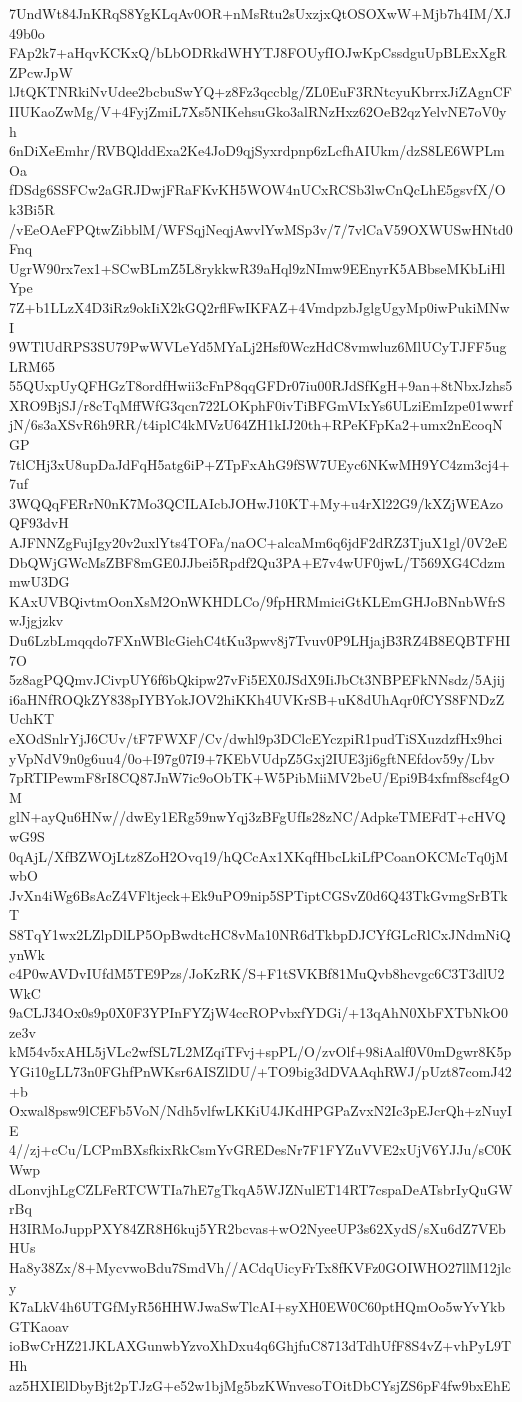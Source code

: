 7UndWt84JnKRqS8YgKLqAv0OR+nMsRtu2sUxzjxQtOSOXwW+Mjb7h4IM/XJ49b0o
FAp2k7+aHqvKCKxQ/bLbODRkdWHYTJ8FOUyfIOJwKpCssdguUpBLExXgRZPcwJpW
lJtQKTNRkiNvUdee2bcbuSwYQ+z8Fz3qccblg/ZL0EuF3RNtcyuKbrrxJiZAgnCF
IIUKaoZwMg/V+4FyjZmiL7Xs5NIKehsuGko3alRNzHxz62OeB2qzYelvNE7oV0yh
6nDiXeEmhr/RVBQlddExa2Ke4JoD9qjSyxrdpnp6zLcfhAIUkm/dzS8LE6WPLmOa
fDSdg6SSFCw2aGRJDwjFRaFKvKH5WOW4nUCxRCSb3lwCnQcLhE5gsvfX/Ok3Bi5R
/vEeOAeFPQtwZibblM/WFSqjNeqjAwvlYwMSp3v/7/7vlCaV59OXWUSwHNtd0Fnq
UgrW90rx7ex1+SCwBLmZ5L8rykkwR39aHql9zNImw9EEnyrK5ABbseMKbLiHlYpe
7Z+b1LLzX4D3iRz9okIiX2kGQ2rflFwIKFAZ+4VmdpzbJglgUgyMp0iwPukiMNwI
9WTlUdRPS3SU79PwWVLeYd5MYaLj2Hsf0WczHdC8vmwluz6MlUCyTJFF5ugLRM65
55QUxpUyQFHGzT8ordfHwii3cFnP8qqGFDr07iu00RJdSfKgH+9an+8tNbxJzhs5
XRO9BjSJ/r8cTqMffWfG3qcn722LOKphF0ivTiBFGmVIxYs6ULziEmIzpe01wwrf
jN/6s3aXSvR6h9RR/t4iplC4kMVzU64ZH1kIJ20th+RPeKFpKa2+umx2nEcoqNGP
7tlCHj3xU8upDaJdFqH5atg6iP+ZTpFxAhG9fSW7UEyc6NKwMH9YC4zm3cj4+7uf
3WQQqFERrN0nK7Mo3QCILAIcbJOHwJ10KT+My+u4rXl22G9/kXZjWEAzoQF93dvH
AJFNNZgFujIgy20v2uxlYts4TOFa/naOC+alcaMm6q6jdF2dRZ3TjuX1gl/0V2eE
DbQWjGWcMsZBF8mGE0JJbei5Rpdf2Qu3PA+E7v4wUF0jwL/T569XG4CdzmmwU3DG
KAxUVBQivtmOonXsM2OnWKHDLCo/9fpHRMmiciGtKLEmGHJoBNnbWfrSwJjgjzkv
Du6LzbLmqqdo7FXnWBlcGiehC4tKu3pwv8j7Tvuv0P9LHjajB3RZ4B8EQBTFHI7O
5z8agPQQmvJCivpUY6f6bQkipw27vFi5EX0JSdX9IiJbCt3NBPEFkNNsdz/5Ajij
i6aHNfROQkZY838pIYBYokJOV2hiKKh4UVKrSB+uK8dUhAqr0fCYS8FNDzZUchKT
eXOdSnlrYjJ6CUv/tF7FWXF/Cv/dwhl9p3DClcEYczpiR1pudTiSXuzdzfHx9hci
yVpNdV9n0g6uu4/0o+I97g07I9+7KEbVUdpZ5Gxj2IUE3ji6gftNEfdov59y/Lbv
7pRTIPewmF8rI8CQ87JnW7ic9oObTK+W5PibMiiMV2beU/Epi9B4xfmf8scf4gOM
glN+ayQu6HNw//dwEy1ERg59nwYqj3zBFgUfIs28zNC/AdpkeTMEFdT+cHVQwG9S
0qAjL/XfBZWOjLtz8ZoH2Ovq19/hQCcAx1XKqfHbcLkiLfPCoanOKCMcTq0jMwbO
JvXn4iWg6BsAcZ4VFltjeck+Ek9uPO9nip5SPTiptCGSvZ0d6Q43TkGvmgSrBTkT
S8TqY1wx2LZlpDlLP5OpBwdtcHC8vMa10NR6dTkbpDJCYfGLcRlCxJNdmNiQynWk
c4P0wAVDvIUfdM5TE9Pzs/JoKzRK/S+F1tSVKBf81MuQvb8hcvgc6C3T3dlU2WkC
9aCLJ34Ox0s9p0X0F3YPInFYZjW4ccROPvbxfYDGi/+13qAhN0XbFXTbNkO0ze3v
kM54v5xAHL5jVLc2wfSL7L2MZqiTFvj+spPL/O/zvOlf+98iAalf0V0mDgwr8K5p
YGi10gLL73n0FGhfPnWKsr6AISZlDU/+TO9big3dDVAAqhRWJ/pUzt87comJ42+b
Oxwal8psw9lCEFb5VoN/Ndh5vlfwLKKiU4JKdHPGPaZvxN2Ic3pEJcrQh+zNuyIE
4//zj+cCu/LCPmBXsfkixRkCsmYvGREDesNr7F1FYZuVVE2xUjV6YJJu/sC0KWwp
dLonvjhLgCZLFeRTCWTIa7hE7gTkqA5WJZNulET14RT7cspaDeATsbrIyQuGWrBq
H3IRMoJuppPXY84ZR8H6kuj5YR2bcvas+wO2NyeeUP3s62XydS/sXu6dZ7VEbHUs
Ha8y38Zx/8+MycvwoBdu7SmdVh//ACdqUicyFrTx8fKVFz0GOIWHO27llM12jlcy
K7aLkV4h6UTGfMyR56HHWJwaSwTlcAI+syXH0EW0C60ptHQmOo5wYvYkbGTKaoav
ioBwCrHZ21JKLAXGunwbYzvoXhDxu4q6GhjfuC8713dTdhUfF8S4vZ+vhPyL9THh
az5HXIElDbyBjt2pTJzG+e52w1bjMg5bzKWnvesoTOitDbCYsjZS6pF4fw9bxEhE
